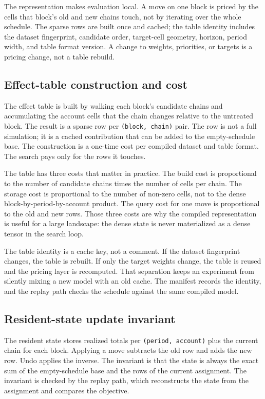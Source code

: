 \documentclass[11pt]{article}
\begin{document}
The representation makes evaluation local. A move on one block is priced by the cells that block's old and new chains touch, not by iterating over the whole schedule. The sparse rows are built once and cached; the table identity includes the dataset fingerprint, candidate order, target-cell geometry, horizon, period width, and table format version. A change to weights, priorities, or targets is a pricing change, not a table rebuild.

\subsection{Effect-table construction and cost}

The effect table is built by walking each block's candidate chains and accumulating the account cells
that the chain changes relative to the untreated block. The result is a sparse row per
\texttt{(block, chain)} pair. The row is not a full simulation; it is a cached contribution that can
be added to the empty-schedule base. The construction is a one-time cost per compiled dataset and table
format. The search pays only for the rows it touches.

The table has three costs that matter in practice. The build cost is proportional to the number of
candidate chains times the number of cells per chain. The storage cost is proportional to the number
of non-zero cells, not to the dense block-by-period-by-account product. The query cost for one move is
proportional to the old and new rows. Those three costs are why the compiled representation is useful
for a large landscape: the dense state is never materialized as a dense tensor in the search loop.

The table identity is a cache key, not a comment. If the dataset fingerprint changes, the table is
rebuilt. If only the target weights change, the table is reused and the pricing layer is recomputed.
That separation keeps an experiment from silently mixing a new model with an old cache. The manifest
records the identity, and the replay path checks the schedule against the same compiled model.

\subsection{Resident-state update invariant}

The resident state stores realized totals per \texttt{(period, account)} plus the current chain for
each block. Applying a move subtracts the old row and adds the new row. Undo applies the inverse. The
invariant is that the state is always the exact sum of the empty-schedule base and the rows of the
current assignment. The invariant is checked by the replay path, which reconstructs the state from the
assignment and compares the objective.
\end{document}
